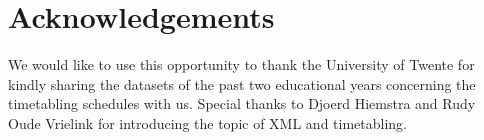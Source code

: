 \section{Acknowledgements}
We would like to use this opportunity to thank the University of Twente for kindly sharing the datasets of the past two educational years concerning the timetabling schedules with us. Special thanks to Djoerd Hiemstra and Rudy Oude Vrielink for introducing the topic of XML and timetabling.